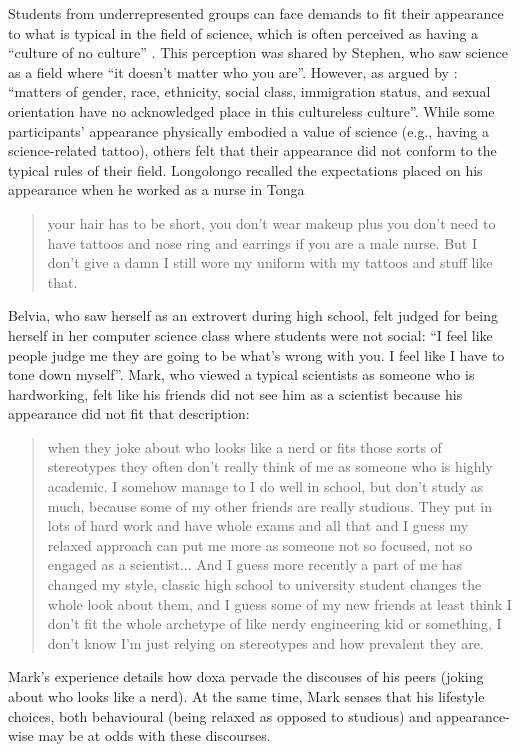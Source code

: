 Students from underrepresented groups can face demands to fit their appearance to what is typical in the field of science, which is often perceived as having a ``culture of no culture'' \citep{traweek2009beamtimes}. This perception was shared by Stephen, who saw science as a field where ``it doesn't matter who you are''. However, as argued by \cite{ong2005body}: ``matters of gender, race, ethnicity, social class, immigration status, and sexual orientation have no acknowledged place in this cultureless culture''. While some participants' appearance physically embodied a value of science (e.g., having a science-related tattoo), others felt that their appearance did not conform to the typical rules of their field.  Longolongo recalled the expectations placed on his appearance when he worked as a nurse in Tonga \blockquote{your hair has to be short, you don't wear makeup plus you don't need to have tattoos and nose ring and earrings if you are a male nurse. But I don’t give a damn I still wore my uniform with my tattoos and stuff like that.} Belvia, who saw herself as an extrovert during high school, felt judged for being herself in her computer science class where students were not social: ``I feel like people judge me they are going to be what’s wrong with you. I feel like I have to tone down myself''. Mark, who viewed a typical scientists as someone who is hardworking, felt like his friends did not see him as a scientist because his appearance did not fit that description: \blockquote{when they joke about who looks like a nerd or fits those sorts of stereotypes they often don't really think of me as someone who is highly academic. I somehow manage to I do well in school, but don’t study as much, because some of my other friends are really studious. They put in lots of hard work and have whole exams and all that and I guess my relaxed approach can put me more as someone not so focused, not so engaged as a scientist... And I guess more recently a part of me has changed my style, classic high school to university student changes the whole look about them, and I guess some of my new friends at least think I don’t fit the whole archetype of like nerdy engineering kid or something, I don't know I’m just relying on stereotypes and how prevalent they are.
} Mark's experience details how  doxa pervade the discouses of his peers (joking about who looks like a nerd). At the same time, Mark senses that his lifestyle choices, both behavioural (being relaxed as opposed to studious) and appearance-wise may be at odds with these discourses.

